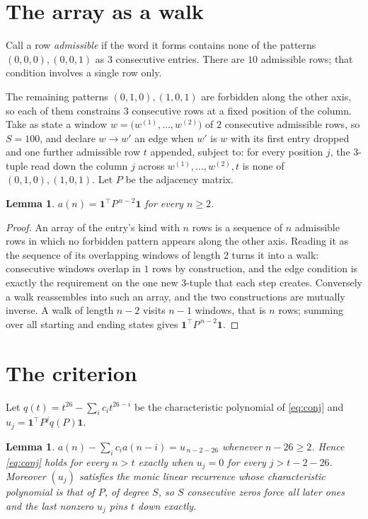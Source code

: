 \documentclass[11pt,a4paper]{article}
\theoremstyle{plain}
\newtheorem{lemma}[theorem]{Lemma}
\theoremstyle{definition}
\begin{document}
\section{The array as a walk}

Call a row \emph{admissible} if the word it forms contains none of the patterns
$(0,0,0), (0,0,1)$ as $3$ consecutive entries. There are $10$ admissible rows; that condition
involves a single row only.

The remaining patterns $(0,1,0), (1,0,1)$ are forbidden along the other axis, so each of them
constrains $3$ consecutive rows at a fixed position of the column. Take as state a
window $w=\bigl(w^{(1)},\dots,w^{(2)}\bigr)$ of $2$ consecutive admissible
rows, so $S=100$, and declare $w\to w'$ an edge when $w'$ is $w$ with its first entry
dropped and one further admissible row $t$ appended, subject to: for every position
$j$, the $3$-tuple read down the column $j$ across $w^{(1)},\dots,w^{(2)},t$
is none of $(0,1,0), (1,0,1)$. Let $P$ be the adjacency matrix.

\begin{lemma}\label{lem:walk}
$a(n)=\mathbf{1}^{\!\top}P^{\,n-2}\mathbf{1}$ for every $n\ge2$.
\end{lemma}

\begin{proof}
An array of the entry's kind with $n$ rows is a sequence of $n$ admissible rows in
which no forbidden pattern appears along the other axis. Reading it as the sequence of its
overlapping windows of length $2$ turns it into a walk: consecutive windows overlap in
$1$ rows by construction, and the edge condition is exactly the requirement on the one
new $3$-tuple that each step creates. Conversely a walk reassembles into such an array,
and the two constructions are mutually inverse. A walk of length $n-2$ visits $n-1$
windows, that is $n$ rows; summing over all starting and ending states gives
$\mathbf{1}^{\!\top}P^{\,n-2}\mathbf{1}$.
\end{proof}

\section{The criterion}

Let $q(t)=t^{26}-\sum_i c_i t^{26-i}$ be the characteristic polynomial of
\eqref{eq:conj} and $u_j=\mathbf{1}^{\!\top}P^{j}q(P)\mathbf{1}$.

\begin{lemma}\label{lem:crit}
$a(n)-\sum_i c_i a(n-i)=u_{\,n-2-26}$ whenever $n-26\ge2$. Hence
\eqref{eq:conj} holds for every $n>t$ exactly when $u_j=0$ for every
$j>t-2-26$. Moreover $(u_j)$ satisfies the monic linear recurrence whose
characteristic polynomial is that of $P$, of degree $S$, so $S$ consecutive zeros force all
later ones and the last nonzero $u_j$ pins $t$ down exactly.
\end{lemma}
\end{document}
